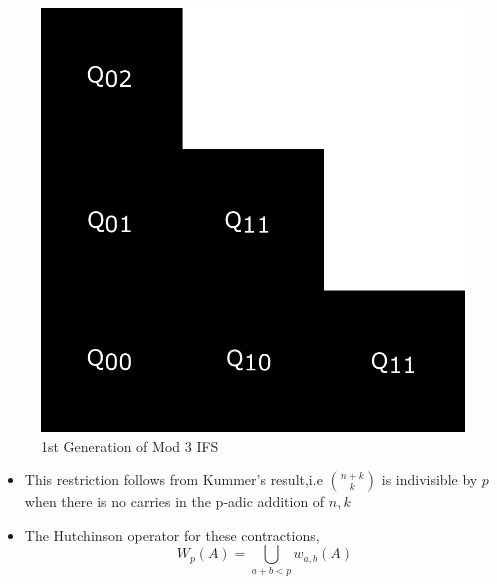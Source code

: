 \documentclass{beamer}
\begin{document}
\begin{frame}
    \begin{figure}
        \centering
        \includegraphics[scale=0.25]{IFSp3.pdf}
        \caption{1st Generation of Mod 3 IFS}
    \end{figure}
    \begin{itemize}
        \item This restriction follows from Kummer's result,i.e $\binom{n+k}{k}$ is indivisible by $p$ when there is no carries in the p-adic addition of $n,k$
        \item The Hutchinson operator for these contractions,
        \begin{equation*}
            W_p(A) = \bigcup_{a+b < p} w_{a,b}(A)
        \end{equation*} 
    \end{itemize}
\end{frame}

\end{document}
